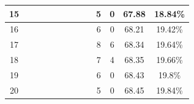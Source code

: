 \begin{table}[H]
{\begin{tabular}{|c|c|c|c|c|c|c|c|c|c|c|c|c|}
15 &  \x    & \x    & \x    & \x    & \x    & \x    &       &       & 5  & 0  & 67.88 & 18.84\% \\ \hline
16 &  \x    & \x    & \x    &       & \x    & \x    &       & \x    & 6  & 0  & 68.21 & 19.42\% \\ \hline
17 &  \x    & \x    & \x    &       & \x\m  & \x\m  &       &       & 8  & 6  & 68.34 & 19.64\% \\ \hline
18 &  \x    & \x    & \x    &       & \x\m  &       &       & \x\m  & 7  & 4  & 68.35 & 19.66\% \\ \hline
19 &  \x    & \x    & \x    & \x    & \x    & \x    & \x    &       & 6  & 0  & 68.43 & 19.8\% \\ \hline
20 &  \x    & \x    & \x    & \x    & \x    &       &       & \x\m  & 5  & 0  & 68.45 & 19.84\% \\ \hline


\end{tabular}}
\end{table}
